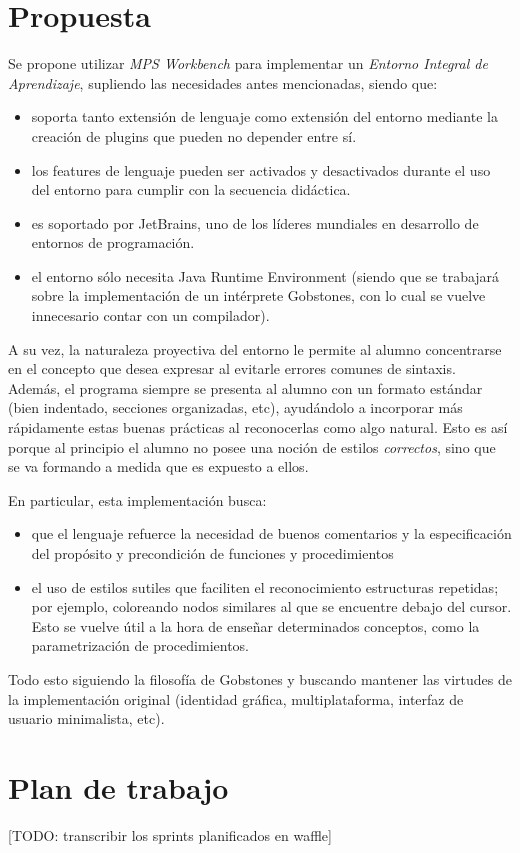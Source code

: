 \section{Propuesta}

Se propone utilizar \textit{MPS Workbench} para implementar un \textit{Entorno Integral de Aprendizaje}, supliendo las necesidades antes mencionadas, siendo que:

\begin{itemize}
  \item soporta tanto extensión de lenguaje como extensión del entorno mediante la creación de plugins que pueden no depender entre sí.
  \item los features de lenguaje pueden ser activados y desactivados durante el uso del entorno para cumplir con la secuencia didáctica.
  \item es soportado por JetBrains, uno de los líderes mundiales en desarrollo de entornos de programación.
  \item el entorno sólo necesita Java Runtime Environment (siendo que se trabajará sobre la implementación de un intérprete Gobstones, con lo cual se vuelve innecesario contar con un compilador).
\end{itemize}

A su vez, la naturaleza proyectiva del entorno le permite al alumno concentrarse en el concepto que desea expresar al evitarle errores comunes de sintaxis. Además, el programa siempre se presenta al alumno con un formato estándar (bien indentado, secciones organizadas, etc), ayudándolo a incorporar más rápidamente estas buenas prácticas al reconocerlas como algo natural. Esto es así porque al principio el alumno no posee una noción de estilos \textit{correctos}, sino que se va formando a medida que es expuesto a ellos.

En particular, esta implementación busca:
\begin{itemize}
  \item que el lenguaje refuerce la necesidad de buenos comentarios y la especificación del propósito y precondición de funciones y procedimientos
  \item el uso de estilos sutiles que faciliten el reconocimiento estructuras repetidas; por ejemplo, coloreando nodos similares al que se encuentre debajo del cursor. Esto se vuelve útil a la hora de enseñar determinados conceptos, como la parametrización de procedimientos.
\end{itemize}

Todo esto siguiendo la filosofía de Gobstones y buscando mantener las virtudes de la implementación original (identidad gráfica, multiplataforma, interfaz de usuario minimalista, etc).

\section{Plan de trabajo}

[TODO: transcribir los sprints planificados en waffle]
